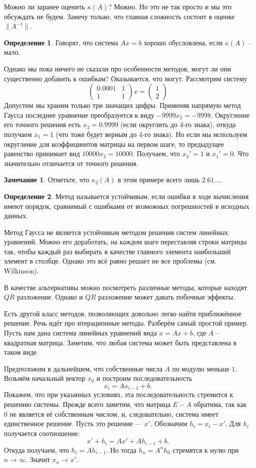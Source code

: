 \documentclass[10pt,a4paper,oneside]{book}
\theoremstyle{definition}
\newtheorem*{rem}{\color{green!50!blue}Замечание}
\newtheorem*{defn}{\color{yellow!30!red} Определение}
\def\dfn{\begin{defn}}
\def\edfn{\end{defn}}
\def\rm{\begin{rem}}
\def\erm{\end{rem}}
\def\pmat{\begin{pmatrix}}
\def\epmat{\end{pmatrix}}
\begin{document}
Можно ли заранее оценить $\kappa(A)$? Можно. Но это не так просто и мы это обсуждать не будем. Замечу только, что главная сложность состоит в оценке $\|A^{-1}\|$.

\dfn
Говорят, что система $Ax=b$ хорошо обусловлена, если $\kappa(A)$ -- мало.
\edfn

Однако мы пока ничего не сказали про особенности методов, могут ли они существенно добавить к ошибкам? Оказывается, что могут. Рассмотрим систему 
$$\pmat 0.0001 & 1 \\ 1 & 1 \epmat x= \pmat 1 \\ 2 \epmat $$
Допустим мы храним только три значащих цифры. Применяя напрямую метод Гаусса последнее уравнение преобразуется к виду $-9999 x_2=-9998 $. Округление его точного решения есть $x_2=0.9999$ (если округлить до 4-го знака), откуда получаем $x_1=1$ (что тоже будет верным до 4-го знака). Но если мы используем округление для коэффициентов матрицы на первом шаге, то предыдущее равенство принимает вид $10000x_2 = 10000$. Получаем, что $x_2'=1$ и $x_1'=0$. Что значительно отличается от точного решения.

\rm Отметьте, что $\kappa_2(A)$ в этом примере всего лишь $2.61...$.
\erm

\dfn Метод называется устойчивым, если ошибки в ходе вычисления имеют порядок, сравнимый с ошибками от возможных погрешностей в исходных данных.
\edfn

Метод Гаусса не является устойчивым методом решения систем линейных уравнений. Можно его доработать, на каждом шаге переставляя строки матрицы так, чтобы каждый раз выбирать в качестве главного элемента  наибольший элемент в столбце. Однако это всё равно решает не все проблемы (см. Wilkinson).

В качестве альтернативы можно посмотреть различные методы, которые находят $QR$ разложение. Однако и $QR$ разложение может давать побочные эффекты.





Есть другой класс методов, позволяющих довольно легко найти приближённое решение. Речь идёт про  итерационные методы. Разберём самый простой пример. Пусть нам дана система линейных уравнений вида $x=Ax+b$, где $A$ -- квадратная матрица. Заметим, что любая система может быть представлена в таком виде. 

Предположим в дальнейшем, что собственные числа $A$ по модулю меньше $1$. Возьмём начальный вектор $x_0$ и построим последовательность
$$x_i=Ax_{i-1}+b.$$
Покажем, что при указанных условиях, эта последовательность стремится к решению системы. Прежде всего заметим, что матрица $E-A$ обратима, так как $0$ не является её собственным числом, и, следовательно, система имеет единственное решение. Пусть это решение --- $x'$. Обозначим $h_i=x_i-x'$. Для $h_i$ получается соотношение:
$$x'+h_i=Ax'+Ah_{i-1}+b.$$
Откуда получаем, что $h_i=Ah_{i-1}$. Но тогда $h_n=A^n h_0$ стремятся к нулю при $n\to \infty$. Значит $x_n\to x'$.
\end{document}
